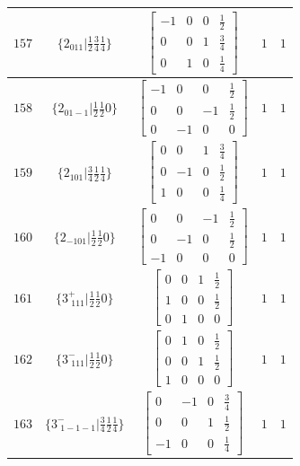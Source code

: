 \documentclass[fleqn,8pt]{jsarticle}
\begin{document}
\begin{longtable}{ccccc}
$ 157 $ & $ \{2{}_{011}|\frac{1}{2} \frac{3}{4} \frac{1}{4}\} $ & $ \begin{bmatrix} -1 & 0 & 0 & \frac{1}{2} \\ 0 & 0 & 1 & \frac{3}{4} \\ 0 & 1 & 0 & \frac{1}{4} \end{bmatrix} $ & $ 1 $ & $ 1 $ \\ \hline
$ 158 $ & $ \{2{}_{01-1}|\frac{1}{2} \frac{1}{2} 0\} $ & $ \begin{bmatrix} -1 & 0 & 0 & \frac{1}{2} \\ 0 & 0 & -1 & \frac{1}{2} \\ 0 & -1 & 0 & 0 \end{bmatrix} $ & $ 1 $ & $ 1 $ \\ \hline
$ 159 $ & $ \{2{}_{101}|\frac{3}{4} \frac{1}{2} \frac{1}{4}\} $ & $ \begin{bmatrix} 0 & 0 & 1 & \frac{3}{4} \\ 0 & -1 & 0 & \frac{1}{2} \\ 1 & 0 & 0 & \frac{1}{4} \end{bmatrix} $ & $ 1 $ & $ 1 $ \\ \hline
$ 160 $ & $ \{2{}_{-101}|\frac{1}{2} \frac{1}{2} 0\} $ & $ \begin{bmatrix} 0 & 0 & -1 & \frac{1}{2} \\ 0 & -1 & 0 & \frac{1}{2} \\ -1 & 0 & 0 & 0 \end{bmatrix} $ & $ 1 $ & $ 1 $ \\ \hline
$ 161 $ & $ \{3^{+}_{\,\,111}|\frac{1}{2} \frac{1}{2} 0\} $ & $ \begin{bmatrix} 0 & 0 & 1 & \frac{1}{2} \\ 1 & 0 & 0 & \frac{1}{2} \\ 0 & 1 & 0 & 0 \end{bmatrix} $ & $ 1 $ & $ 1 $ \\ \hline
$ 162 $ & $ \{3^{-}_{\,\,111}|\frac{1}{2} \frac{1}{2} 0\} $ & $ \begin{bmatrix} 0 & 1 & 0 & \frac{1}{2} \\ 0 & 0 & 1 & \frac{1}{2} \\ 1 & 0 & 0 & 0 \end{bmatrix} $ & $ 1 $ & $ 1 $ \\ \hline
$ 163 $ & $ \{3^{-}_{\,\,1-1-1}|\frac{3}{4} \frac{1}{2} \frac{1}{4}\} $ & $ \begin{bmatrix} 0 & -1 & 0 & \frac{3}{4} \\ 0 & 0 & 1 & \frac{1}{2} \\ -1 & 0 & 0 & \frac{1}{4} \end{bmatrix} $ & $ 1 $ & $ 1 $ \\ \hline

\end{longtable}
\end{document}

